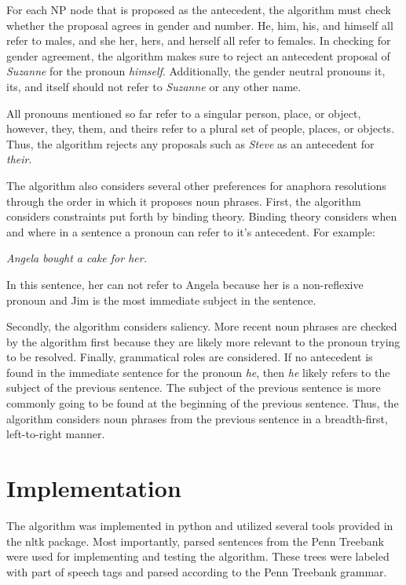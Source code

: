 \documentclass[11pt]{article}
\begin{document}
For each NP node that is proposed as the antecedent, the algorithm must check whether the proposal agrees in gender and number. He, him, his, and himself all refer to males, and she her, hers, and herself all refer to females. In checking for gender agreement, the algorithm makes sure to reject an antecedent proposal of \textit{Suzanne} for the pronoun \textit{himself}. Additionally, the gender neutral pronouns it, its, and itself should not refer to \textit{Suzanne} or any other name. 

All pronouns mentioned so far refer to a singular person, place, or object, however, they, them, and theirs refer to a plural set of people, places, or objects. Thus, the algorithm rejects any proposals such as \textit{Steve} as an antecedent for \textit{their}.

The algorithm also considers several other preferences for anaphora resolutions through the order in which it proposes noun phrases. First, the algorithm considers constraints put forth by binding theory. Binding theory considers when and where in a sentence a pronoun can refer to it's antecedent. For example:

\begin{center}
\textit{Angela bought a cake for her.}
\end{center}

In this sentence, her can not refer to Angela because her is a non-reflexive pronoun and Jim is the most immediate subject in the sentence.

Secondly, the algorithm considers saliency. More recent noun phrases are checked by the algorithm first because they are likely more relevant to the pronoun trying to be resolved. Finally, grammatical roles are considered. If no antecedent is found in the immediate sentence for the pronoun \textit{he}, then \textit{he} likely refers to the subject of the previous sentence. The subject of the previous sentence is more commonly going to be found at the beginning of the previous sentence. Thus, the algorithm considers noun phrases from the previous sentence in a breadth-first, left-to-right manner.

\section{Implementation}

The algorithm was implemented in python and utilized several tools provided in the nltk package. Most importantly, parsed sentences from the Penn Treebank were used for implementing and testing the algorithm. These trees were labeled with part of speech tags and parsed according to the Penn Treebank grammar. 
\end{document}
